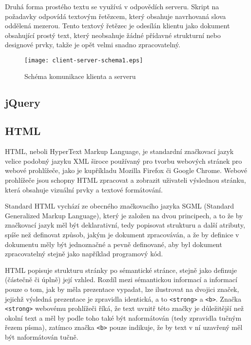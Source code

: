 \documentclass[a4paper,11pt]{article}
\begin{document}
Druhá forma prostého textu se využívá v odpovědích serveru. Skript na požadavky odpovídá textovým řetězcem, který obsahuje navrhovaná slova oddělená mezerou. Tento textový řetězec je odesílán klientu jako dokument obsahující prostý text, který neobsahuje žádné přídavné strukturní nebo designové prvky, takže je opět velmi snadno zpracovatelný.

\begin{figure}[h]
	\centering
	\texttt{[image: client-server-schema1.eps]}
	\caption{Schéma komunikace klienta a serveru}
	\label{fig:clientserver}
\end{figure}

\subsection{jQuery}


\subsection{HTML}

HTML, neboli HyperText Markup Language, je standardní značkovací jazyk velice podobný jazyku XML široce používaný pro tvorbu webových stránek pro webové prohlížeče, jako je kupříkladu Mozilla Firefox či Google Chrome. Webové prohlížeče jsou schopny HTML zpracovat a zobrazit uživateli výslednou stránku, která obsahuje vizuální prvky a textové formátování. 

Standard HTML vychází ze obecného značkovacího jazyka SGML (Standard Generalized Markup Language), který je založen na dvou principech, a to že by značkovací jazyk měl být deklarativní, tedy popisovat strukturu a další atributy, spíše než definovat způsob, jakým je dokument zpracováván, a že by definice v dokumentu měly být jednoznačné a pevně definované, aby byl dokument zpracovatelný stejně jako například programový kód. %


HTML popisuje strukturu stránky po sémantické stránce, stejně jako definuje (částečně či úplně) její vzhled. Rozdíl mezi sémantickou informací a informací pouze o tom, jak by měla prezentace vypadat, lze ilustrovat na dvojici značek, jejichž výsledná prezentace je zpravidla identická, a to {\tt <strong>} a {\tt <b>}. Značka {\tt <strong>} webovému prohlížeči říká, že text uvnitř této značky je důležitější než okolní text a měl by podle toho také být naformátován (tedy zpravidla tučným řezem písma), zatímco značka {\tt <b>} pouze indikuje, že by text v ní uzavřený měl být naformátován tučně. %
\end{document}

